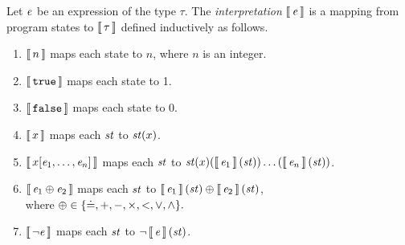 \begin{definition}\label{def:boogie/interpret-expression}
Let $\expr$ be an expression of the type $\tau$. The \emph{interpretation} $\interp{\expr}$ is a mapping from program states to $\interp{\tau}$ defined inductively as follows.
\begin{enumerate}
  \item $\interp{n}$ maps each state to $n$, where $n$ is an integer.
  \item $\interp{\ttrue}$ maps each state to 1.
  \item $\interp{\tfalse}$ maps each state to 0.
  \item $\interp{x}$ maps each $\State$ to $\State(x)$.
  \item $\interp{x[\expr_1,\ldots,\expr_n]}$ maps each $\State$ to $\State(x)(\interp{\expr_1}(\State))\ldots(\interp{\expr_n}(\State))$.
  \item $\interp{\expr_1 \oplus \expr_2}$ maps each $\State$ to $\interp{\expr_1}(\State)\oplus\interp{\expr_2}(\State)$,\\where $\oplus \in \{ \eql, +, -, \times, <, \vee, \wedge \}.$
  \item $\interp{\neg\expr}$ maps each $\State$ to $\neg\interp{\expr}(\State)$.\QED
\end{enumerate}
\end{definition}

